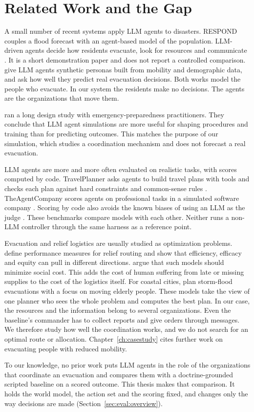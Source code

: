 \section{Related Work and the Gap}
\label{sec:bg:related}

A small number of recent systems apply LLM agents to disasters. RESPOND couples
a flood forecast with an agent-based model of the population. LLM-driven
agents decide how residents evacuate, look for resources and communicate
\parencite{sultimov2026}. It is a short demonstration paper and does not report
a controlled comparison. \textcite{lee2025} give LLM agents synthetic personas
built from mobility and demographic data, and ask how well they predict real
evacuation decisions. Both works model the people who evacuate. In our system
the residents make no decisions. The agents are the organizations that move
them.

\textcite{li2026} ran a long
design study with emergency-preparedness practitioners. They conclude that LLM
agent simulations are more useful for shaping procedures and training than for
predicting outcomes. This matches the purpose of our simulation, which studies
a coordination mechanism and does not forecast a real evacuation.

LLM agents are more and more often evaluated on realistic tasks, with scores
computed by code. TravelPlanner asks agents to build travel plans with tools
and checks each plan against hard constraints and common-sense rules
\parencite{xie2024a}. TheAgentCompany scores agents on professional
tasks in a simulated software company \parencite{xu2025}. Scoring by code also
avoids the known biases of using an LLM as the judge \parencite{zheng2023}.
These benchmarks compare models with each other. Neither runs a
non-LLM controller through the same harness as a reference point.

Evacuation and relief logistics are usually studied as optimization problems.
\textcite{huang2012} define performance measures for relief routing and show
that efficiency, efficacy and equity can pull in different directions.
\textcite{holguin-veras2013} argue that such models should minimize social
cost. This adds the cost of human suffering from late or missing supplies to
the cost of the logistics itself. For coastal cities, \textcite{yin2024} plan
storm-flood evacuations with a focus on moving elderly people. These models
take the view of one planner who sees the whole problem and computes the best
plan. In our case, the resources and the information belong to several
organizations. Even the baseline's commander has to collect reports and give
orders through messages. We therefore study how well the coordination works,
and we do not search for an optimal route or allocation.
Chapter~\ref{ch:casestudy} cites further work on evacuating people with reduced
mobility.

To our knowledge, no prior work puts LLM agents in the role of the
organizations that coordinate an evacuation and compares them with a
doctrine-grounded scripted baseline on a scored outcome. This thesis makes that
comparison. It holds the world model, the action set and the scoring fixed, and
changes only the way decisions are made (Section~\ref{sec:eval:overview}).

